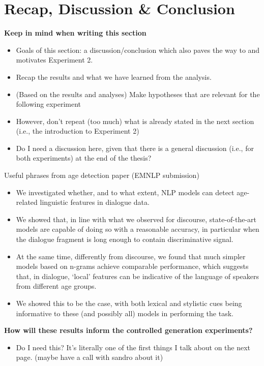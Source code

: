 \section{Recap, Discussion \& Conclusion}

\textbf{Keep in mind when writing this section}
\begin{itemize}
    \item Goals of this section: a discussion/conclusion which also paves the way to and motivates Experiment 2.
    \item Recap the results and what we have learned from the analysis.
    \item (Based on the results and analyses) Make hypotheses that are relevant for the following experiment
    \item However, don't repeat (too much) what is already stated in the next section (i.e., the introduction to Experiment 2)
    \item Do I need a discussion here, given that there is a general discussion (i.e., for both experiments) at the end of the thesis?
\end{itemize}

Useful phrases from age detection paper (EMNLP submission)

\begin{itemize}
    \item We investigated whether, and to what extent, NLP models can detect age-related linguistic features in dialogue data.
    \item We showed that, in line with what we observed for discourse, state-of-the-art models are capable of doing so with a reasonable accuracy, in particular when the dialogue fragment is long enough to contain discriminative signal.
    \item At the same time, differently from discourse, we found that much simpler models based on n-grams achieve comparable performance, which suggests that, in dialogue, ‘local’ features can be indicative of the language of speakers from different age groups.
    \item We showed this to be the case, with both lexical and stylistic cues being informative to these (and possibly all) models in performing the task.
\end{itemize}

\textbf{How will these results inform the controlled generation experiments?}

\begin{itemize}
    \item Do I need this? It's literally one of the first things I talk about on the next page. (maybe have a call with sandro about it)
\end{itemize}